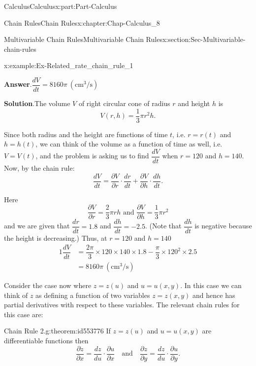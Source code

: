 \documentclass[oneside,10pt,]{book}
\newcommand{\blocktitlefont}{\relax}
\numberwithin{equation}{section}
\newcommand{\amp}{&}
\begin{document}
\begin{partptx}{Calculus}{}{Calculus}{}{}{x:part:Part-Calculus}
\begin{chapterptx}{Chain Rules}{}{Chain Rules}{}{}{x:chapter:Chap-Calculus_8}
\begin{sectionptx}{Multivariable Chain Rules}{}{Multivariable Chain Rules}{}{}{x:section:Sec-Multivariable-chain-rules}
\begin{example}{}{x:example:Ex-Related_rate_chain_rule_1}
\par\smallskip%
\noindent\textbf{\blocktitlefont Answer}.\hypertarget{g:answer:id553656}{}\quad{}\(\dfrac{dV}{dt} = 8160\pi \  (\text{cm}^3\text{/s})\)%
\par\smallskip%
\noindent\textbf{\blocktitlefont Solution}.\hypertarget{g:solution:id553702}{}\quad{}The volume \(V\) of right circular cone of radius \(r\) and height \(h\) is%
\begin{equation*}
V(r,h) = \dfrac{1}{3}\pi r^2h.
\end{equation*}
%
\par
Since both radius and the height are functions of time \(t\), i.e. \(r=r(t)\) and \(h=h(t)\), we can think of the volume as a function of time as well, i.e. \(V=V(t)\), and the problem is asking us to find \(\dfrac{dV}{dt}\) when \(r=120\) and \(h=140\). Now, by the chain rule:%
\begin{equation*}
\dfrac{dV}{dt} = \dfrac{\partial V}{\partial r}\cdot \dfrac{dr}{dt} + \dfrac{\partial V}{\partial h}\cdot \dfrac{dh}{dt}.
\end{equation*}
%
\par
Here%
\begin{equation*}
\dfrac{\partial V}{\partial r}  = \dfrac{2}{3}\pi rh \text{ and } \dfrac{\partial V}{\partial h} =\dfrac{1}{3}\pi r^2
\end{equation*}
and we are given that \(\dfrac{dr}{dt} = 1.8\) and \(\dfrac{dh}{dt} = -2.5\). (Note that \(\dfrac{dh}{dt}\) is negative because the height is decreasing.) Thus, at \(r=120\) and \(h=140\)%
\begin{alignat*}{1}
\dfrac{dV}{dt} \amp = \dfrac{2\pi}{3} \times 120 \times 140 \times 1.8  - \dfrac{\pi}{3}\times 120^2 \times 2.5\\
\amp =  8160\pi \  (\text{cm}^3\text{/s})
\end{alignat*}
%
\end{example}
Consider the case now where \(z=z(u)\) and \(u=u(x,y)\). In this case we can think of \(z\) as defining a function of two variables \(z=z(x,y)\) and hence has partial derivatives with respect to these variables. The relevant chain rules for this case are:%
\begin{theorem}{Chain Rule 2.}{}{g:theorem:id553776}%
If \(z=z(u)\) and \(u=u(x,y)\) are differentiable functions then%
\begin{equation*}
\dfrac{\partial z}{\partial x} =  \dfrac{dz}{du}\cdot\dfrac{\partial u}{\partial x} \quad \text{and} \quad  \dfrac{\partial z}{\partial y} = \dfrac{dz}{du}\cdot\dfrac{\partial u}{\partial y}.

\end{equation*}
\end{theorem}
\end{sectionptx}
\end{chapterptx}
\end{partptx}
\end{document}
